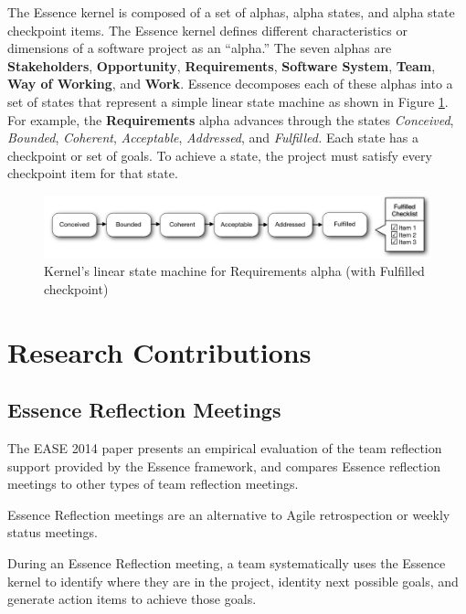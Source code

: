 \documentclass[preprint,12pt,3p]{elsarticle}
\begin{document}
The Essence kernel is composed of a set of alphas, alpha states, and alpha state checkpoint items. The Essence kernel defines different characteristics or dimensions of a software project as an ``alpha.'' The seven alphas are \textbf{Stakeholders}, \textbf{Opportunity}, \textbf{Requirements}, \textbf{Software System}, \textbf{Team}, \textbf{Way of Working}, and \textbf{Work}. Essence decomposes each of these alphas into a set of states that represent a simple linear state machine as shown in Figure \ref{StateMachine}. For example, the \textbf{Requirements} alpha advances through the states \textit{Conceived}, \textit{Bounded}, \textit{Coherent}, \textit{Acceptable}, \textit{Addressed}, and \textit{Fulfilled.} Each state has a checkpoint or set of goals. To achieve a state, the project must satisfy every checkpoint item for that state. \cite{OMGStandard} 
 
\begin{figure}[h]\vspace*{4pt}
\centerline{\includegraphics[width=5.4in]{kernel_images/StateMachineRequirements}}
\caption{Kernel's linear state machine for Requirements alpha (with Fulfilled checkpoint)}\vspace*{-6pt}\label{StateMachine}
\end{figure}

\section{Research Contributions}

\subsection{Essence Reflection Meetings}
\label{EssenceReflectionMeetings}

The EASE 2014 paper presents an empirical evaluation of the team reflection support provided by the Essence framework, and compares Essence reflection meetings to other types of team reflection meetings.

Essence Reflection meetings are an alternative to Agile retrospection or weekly status meetings. 

During an Essence Reflection meeting, a team systematically uses the Essence kernel to identify where they are in the project, identity next possible goals, and generate action items to achieve those goals. 
\end{document}
